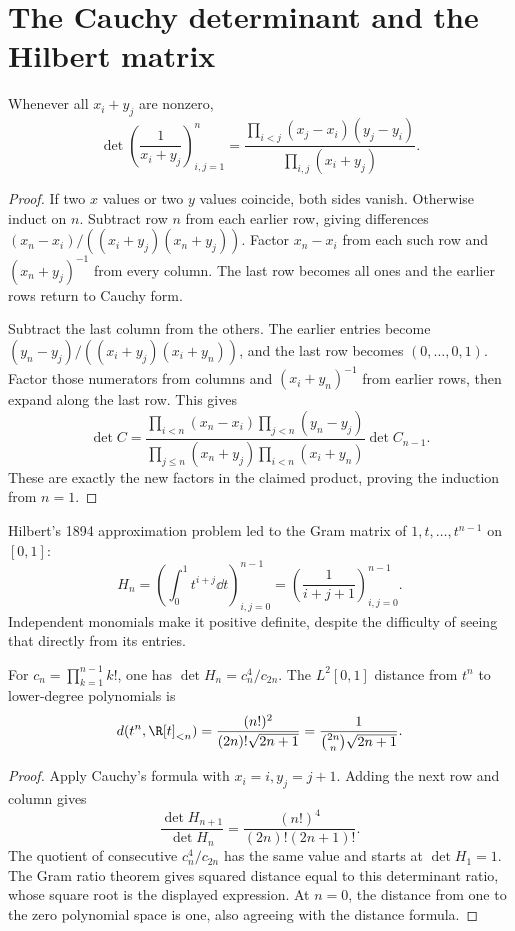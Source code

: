 \section{The Cauchy determinant and the Hilbert matrix}
\begin{theorem}[Cauchy, 1841]\label{linear:thm:cauchydet}
Whenever all $x_i+y_j$ are nonzero,
\[\det\left(\frac1{x_i+y_j}\right)_{i,j=1}^n
 =\frac{\prod_{i<j}(x_j-x_i)(y_j-y_i)}{\prod_{i,j}(x_i+y_j)}.\]
\end{theorem}
\begin{proof}
If two $x$ values or two $y$ values coincide, both sides vanish. Otherwise induct on $n$. Subtract row $n$ from each earlier row, giving differences $(x_n-x_i)/((x_i+y_j)(x_n+y_j))$. Factor $x_n-x_i$ from each such row and $(x_n+y_j)^{-1}$ from every column. The last row becomes all ones and the earlier rows return to Cauchy form.

Subtract the last column from the others. The earlier entries become $(y_n-y_j)/((x_i+y_j)(x_i+y_n))$, and the last row becomes $(0,\ldots,0,1)$. Factor those numerators from columns and $(x_i+y_n)^{-1}$ from earlier rows, then expand along the last row. This gives
\[\det C=\frac{\prod_{i<n}(x_n-x_i)\prod_{j<n}(y_n-y_j)}{\prod_{j\le n}(x_n+y_j)\prod_{i<n}(x_i+y_n)}\det C_{n-1}.
\]
These are exactly the new factors in the claimed product, proving the induction from $n=1$.
\end{proof}

Hilbert's 1894 approximation problem led to the Gram matrix of $1,t,\ldots,t^{n-1}$ on $[0,1]$:
\[H_n=\left(\int_0^1t^{i+j}\dd t\right)_{i,j=0}^{n-1}
 =\left(\frac1{i+j+1}\right)_{i,j=0}^{n-1}.
\]
Independent monomials make it positive definite, despite the difficulty of seeing that directly from its entries.

\begin{corollary}\label{linear:cor:hilbert}
For $c_n=\prod_{k=1}^{n-1}k!$, one has $\det H_n=c_n^4/c_{2n}$. The $L^2[0,1]$ distance from $t^n$ to lower-degree polynomials is
\[d(t^n,\R[t]_{<n})=\frac{(n!)^2}{(2n)!\sqrt{2n+1}}
 =\frac1{\binom{2n}n\sqrt{2n+1}}.\]
\end{corollary}
\begin{proof}
Apply Cauchy's formula with $x_i=i,y_j=j+1$. Adding the next row and column gives
\[\frac{\det H_{n+1}}{\det H_n}=\frac{(n!)^4}{(2n)!(2n+1)!}.
\]
The quotient of consecutive $c_n^4/c_{2n}$ has the same value and starts at $\det H_1=1$. The Gram ratio theorem gives squared distance equal to this determinant ratio, whose square root is the displayed expression. At $n=0$, the distance from one to the zero polynomial space is one, also agreeing with the distance formula.
\end{proof}

